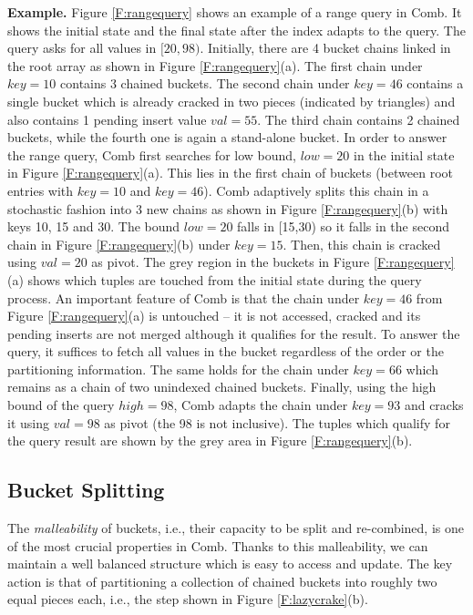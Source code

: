 \newpage
\textbf{Example.}
Figure \ref{F:rangequery} shows an example of a range query in Comb.
It shows the initial state and the final state after the index adapts to the query.
The query asks for all values in $[20,98)$.
Initially, there are 4 bucket chains linked in the root array as shown in Figure \ref{F:rangequery}(a).
The first chain under $key=10$ contains 3 chained buckets. 
The second chain under $key=46$ contains a single bucket which is already cracked in two pieces (indicated by triangles)
and also contains 1 pending insert value $val=55$. 
The third chain contains 2 chained buckets, while the fourth one is again a stand-alone bucket.
In order to answer the range query, Comb first searches for low bound, $low=20$
in the initial state in Figure \ref{F:rangequery}(a). 
This lies in the first chain of buckets (between root entries with $key=10$ and
 $key=46$).
Comb adaptively splits this chain in a stochastic fashion
into 3 new chains as shown in Figure \ref{F:rangequery}(b) with keys 10, 15
and 30. The bound $low=20$ falls in [15,30) so it falls in the second chain in Figure \ref{F:rangequery}(b)
under $key=15$. Then, this chain is cracked using $val=20$ as pivot. 
The grey region in the buckets in  Figure \ref{F:rangequery}(a) shows which tuples
are touched from the initial state during the query process.
An important feature of Comb is that
the chain under $key=46$ from Figure \ref{F:rangequery}(a) is untouched --
it is not accessed, cracked and its pending inserts are not merged 
although it qualifies for the result.
To answer the query, it suffices
to fetch all values in the bucket regardless of the order or the partitioning information. 
The same holds for the chain under $key=66$ which remains as a chain of two unindexed chained buckets.
Finally, using the high bound of the query $high=98$, Comb adapts the chain under $key=93$ 
and cracks it using $val=98$ as pivot (the 98 is not inclusive).
The tuples which qualify for the query result are shown by the grey area
in  Figure \ref{F:rangequery}(b).



\subsection{Bucket Splitting}
\label{sec:splitting}

The {\em malleability} of buckets, i.e., their capacity to be split and re-combined, 
is one of the most crucial properties in Comb.
Thanks to this malleability, we can maintain a well balanced structure which is easy to access and update.
The key action is that of partitioning a collection of chained buckets into roughly two equal pieces each, i.e., 
the step shown in Figure \ref{F:lazycrake}(b).

